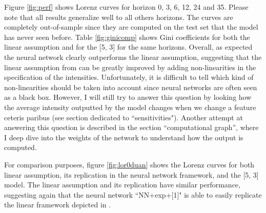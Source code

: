 Figure \ref{fig:perf} shows Lorenz curves for horizon 0, 3, 6, 12, 24 and 35. Please note that all results generalize well to all others horizons. The curves are completely out-of-sample since they are computed on the test set that the model has never seen before. Table \ref{fig:ginicomp} shows Gini coefficients for both the linear assumption \citet{Duan2012} and for the [5, 3] for the same horizons. Overall, as expected the neural network clearly outperforms the linear assumption, suggesting that the linear assumption from \citet{Duan2012} can be greatly improved by adding non-linearities in the specification of the intensities. Unfortunately, it is difficult to tell which kind of non-linearities should be taken into account since neural networks are often seen as a black box. However, I will still try to answer this question by looking how the average intensity outputted by the model changes when we change a feature ceteris paribus (see section dedicated to ``sensitivities"). Another attempt at answering this question is described in the section ``computational graph'', where I deep dive into the weights of the network to understand how the output is computed.

For comparison purposes, figure \ref{fig:lor0duan} shows the Lorenz curves for both linear assumption, its replication in the neural network framework, and the [5, 3] model. The linear assumption and its replication have similar performance, suggesting again that the neural network ``NN+exp+[1]" is able to easily replicate the linear framework depicted in \citet{Duan2012}.

